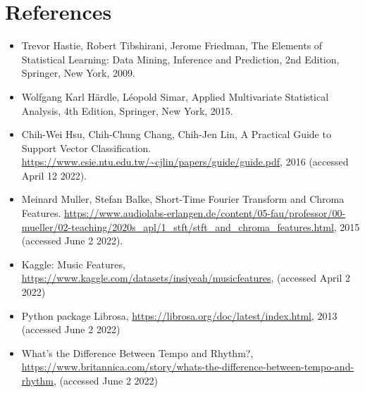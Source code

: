 \documentclass[12pt,a4paper]{article}
\begin{document}
\section*{References}
\begin{itemize}
  \item Trevor Hastie, Robert Tibshirani, Jerome Friedman, The Elements of Statistical Learning: Data Mining, Inference and Prediction, 2nd Edition, Springer, New York, 2009.
  \item Wolfgang Karl Härdle, Léopold Simar,  Applied Multivariate Statistical Analysis, 4th Edition, Springer, New York, 2015.
  \item Chih-Wei Hsu, Chih-Chung Chang, Chih-Jen Lin, A Practical Guide to Support Vector Classification. \url{https://www.csie.ntu.edu.tw/~cjlin/papers/guide/guide.pdf}, 2016 (accessed April 12 2022).
  \item Meinard Muller, Stefan Balke, Short-Time Fourier Transform and Chroma Features. \url{https://www.audiolabs-erlangen.de/content/05-fau/professor/00-mueller/02-teaching/2020s_apl/1_stft/stft_and_chroma_features.html}, 2015 (accessed June 2 2022).
  \item Kaggle: Music Features, \url{https://www.kaggle.com/datasets/insiyeah/musicfeatures}, (accessed April 2 2022)
  \item Python package Librosa, \url{https://librosa.org/doc/latest/index.html}, 2013 (accessed June 2 2022)
  \item What's the Difference Between Tempo and Rhythm?, \url{https://www.britannica.com/story/whats-the-difference-between-tempo-and-rhythm}, (accessed June 2 2022)
\end{itemize}
\end{document}
